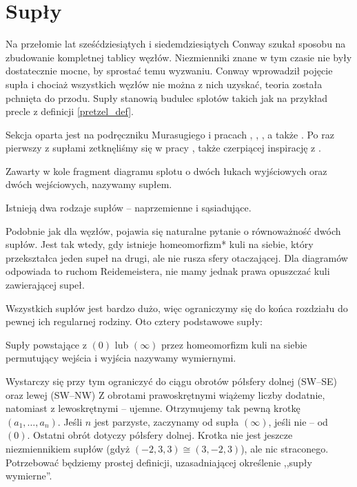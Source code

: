 \section{Supły} %
\label{sec:tangle}

Na przełomie lat sześćdziesiątych i siedemdziesiątych Conway szukał sposobu na zbudowanie kompletnej tablicy węzłów.
Niezmienniki znane w tym czasie nie były dostatecznie mocne, by sprostać temu wyzwaniu.
Conway wprowadził pojęcie supła i chociaż wszystkich węzłów nie można z nich uzyskać, teoria została pchnięta do przodu.
Supły stanowią budulec splotów takich jak na przykład precle z definicji \ref{pretzel_def}.

Sekcja oparta jest na podręczniku Murasugiego \cite{murasugi96} i pracach \cite{conway70}, \cite{kauffman97}, \cite{kauffman04}, a także \cite{schubert56}.
Po raz pierwszy z supłami zetknęliśmy się w pracy \cite{janiak04}, także czerpiącej inspirację z \cite{murasugi96}.

\begin{definition}[supeł]
\label{def:tangle}
	Zawarty w kole fragment diagramu splotu o dwóch łukach wyjściowych oraz dwóch wejściowych, nazywamy supłem.
\end{definition}

Istnieją dwa rodzaje supłów -- naprzemienne i sąsiadujące.


Podobnie jak dla węzłów, pojawia się naturalne pytanie o równoważność dwóch supłów.
Jest tak wtedy, gdy istnieje homeomorfizm* kuli na siebie, który przekształca jeden supeł na drugi, ale nie rusza sfery otaczającej.
Dla diagramów odpowiada to ruchom Reidemeistera, nie mamy jednak prawa opuszczać kuli zawierającej supeł.

Wszystkich supłów jest bardzo dużo, więc ograniczymy się do końca rozdziału do pewnej ich regularnej rodziny.
Oto cztery podstawowe supły:


\begin{definition}
\label{def:rational_tangle}
	Supły powstające z $(0)$ lub $(\infty)$ przez homeomorfizm kuli na siebie permutujący wejścia i wyjścia nazywamy wymiernymi.
\end{definition}

Wystarczy się przy tym ograniczyć do ciągu obrotów półsfery dolnej (SW--SE) oraz lewej (SW--NW)
Z obrotami prawoskrętnymi wiążemy liczby dodatnie, natomiast z lewoskrętnymi -- ujemne.
Otrzymujemy tak pewną krotkę $(a_1, \ldots, a_n)$.
Jeśli $n$ jest parzyste, zaczynamy od supła $(\infty)$, jeśli nie -- od $(0)$.
Ostatni obrót dotyczy półsfery dolnej.
Krotka nie jest jeszcze niezmiennikiem supłów (gdyż $(-2,3,3) \cong (3, -2, 3)$), ale nic straconego.
Potrzebować będziemy prostej definicji, uzasadniającej określenie ,,supły wymierne''.


